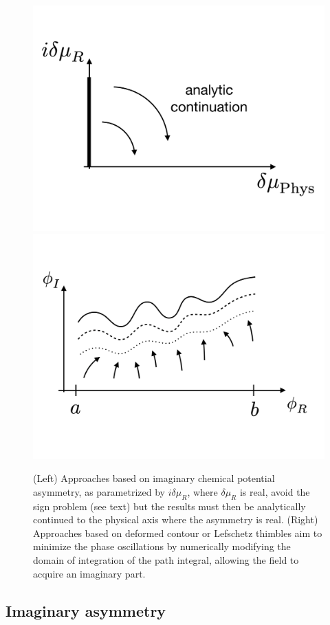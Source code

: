 \documentclass[../main.tex]{subfiles}
\begin{document}
\begin{figure}[t]
  \centering
  \includegraphics[width=0.49 \columnwidth]{./2generalformalism/AnalyticContinuationCartoon.pdf}
  \includegraphics[width=0.49 \columnwidth]{./2generalformalism/ThimblesCartoon.pdf}
  \caption{\label{fig:ComplexPlaneMethodsCartoons} (Left) Approaches based on imaginary chemical potential asymmetry,
  as parametrized by $i \delta \mu_R$, where $\delta \mu_R$ is real, avoid the sign problem (see text) but the results must then
  be analytically continued to the physical axis where the asymmetry is real. (Right) Approaches based on deformed contour or Lefschetz thimbles
  aim to minimize the phase oscillations by numerically modifying the domain of integration of the path integral, allowing the field to acquire an imaginary part.}
\end{figure}
\subsection{Imaginary asymmetry~\label{sect:ImaginaryAsymmetry}}
\end{document}

